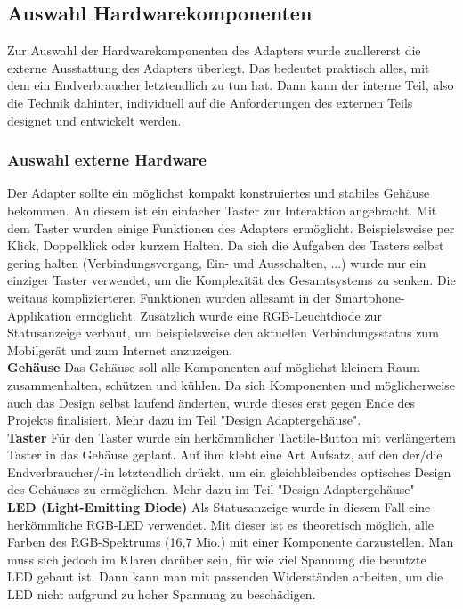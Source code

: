 \documentclass[11pt, twoside]{article}
\begin{document}
\subsection{Auswahl Hardwarekomponenten}
Zur Auswahl der Hardwarekomponenten des Adapters wurde zuallererst die externe Ausstattung des Adapters überlegt. Das bedeutet praktisch alles, mit dem ein Endverbraucher letztendlich zu tun hat. Dann kann der interne Teil, also die Technik dahinter, individuell auf die Anforderungen des externen Teils designet und entwickelt werden.
\subsubsection{Auswahl externe Hardware}
Der Adapter sollte ein möglichst kompakt konstruiertes und stabiles Gehäuse bekommen. An diesem ist ein einfacher Taster zur Interaktion angebracht. Mit dem Taster wurden einige Funktionen des Adapters ermöglicht. Beispielsweise per Klick, Doppelklick oder kurzem Halten. Da sich die Aufgaben des Tasters selbst gering halten (Verbindungsvorgang, Ein- und Ausschalten, ...) wurde nur ein einziger Taster verwendet, um die Komplexität des Gesamtsystems zu senken. Die weitaus komplizierteren Funktionen wurden allesamt in der Smartphone-Applikation ermöglicht. Zusätzlich wurde eine RGB-Leuchtdiode zur Statusanzeige verbaut, um beispielsweise den aktuellen Verbindungsstatus zum Mobilgerät und zum Internet anzuzeigen. \newline \\
\textbf{Gehäuse} \newline
Das Gehäuse soll alle Komponenten auf möglichst kleinem Raum zusammenhalten, schützen und kühlen. Da sich Komponenten und möglicherweise auch das Design selbst laufend änderten, wurde dieses erst gegen Ende des Projekts finalisiert. Mehr dazu im Teil "Design Adaptergehäuse". \newline \\
\textbf{Taster} \newline
Für den Taster wurde ein herkömmlicher Tactile-Button mit verlängertem Taster in das Gehäuse geplant. Auf ihm klebt eine Art Aufsatz, auf den der/die Endverbraucher/-in letztendlich drückt, um ein gleichbleibendes optisches Design des Gehäuses zu ermöglichen. Mehr dazu im Teil "Design Adaptergehäuse"\newline \\
\textbf{LED (Light-Emitting Diode)} \newline
Als Statusanzeige wurde in diesem Fall eine herkömmliche RGB-LED verwendet. Mit dieser ist es theoretisch möglich, alle Farben des RGB-Spektrums (16,7 Mio.) mit einer Komponente darzustellen.\newline
Man muss sich jedoch im Klaren darüber sein, für wie viel Spannung die benutzte LED gebaut ist. Dann kann man mit passenden Widerständen arbeiten, um die LED nicht aufgrund zu hoher Spannung zu beschädigen. \parencite[vgl.][]{noauthor_urlnl05_nodate}
\end{document}
